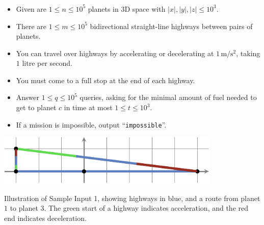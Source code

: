 \begin{frame}
    \frametitle{\problemtitle}

    \begin{itemize}
    \item Given are $1\leq n\leq 10^5$ planets in $3$D space with $\left|x\right|,\left|y\right|,\left|z\right|\leq10^3$.
    \item There are $1\leq m\leq 10^5$ bidirectional straight-line highways
      between pairs of planets.
    \item You can travel over highways by accelerating or decelerating
      at $1\,\textrm{m}/\textrm{s}^2$, taking $1$ litre per second.
    \item You must come to a full stop at the end of each highway.
    \item Answer $1\leq q\leq 10^5$ queries, asking for the minimal amount of
      fuel needed to get to planet $c$ in time at most $1\leq t\leq 10^3$.
    \item If a mission is impossible, output ``\texttt{impossible}''.
    \end{itemize}

    \vspace{0.5em}

    \centering
    \includegraphics[width=0.8\textwidth]{sample1.pdf}

    \small Illustration of Sample Input 1, showing highways in blue, and a
    route from planet $1$ to planet $3$.
    The green start of a highway indicates acceleration,
    and the red end indicates deceleration.
\end{frame}
